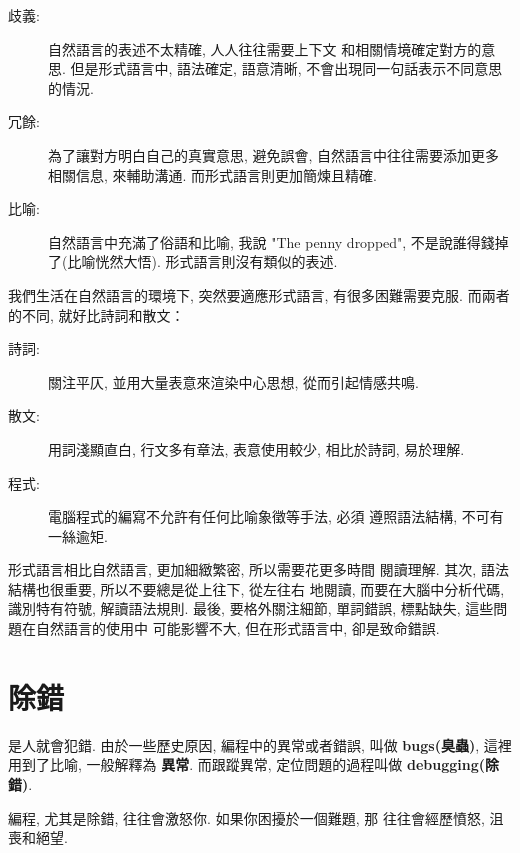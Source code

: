 \documentclass[10pt]{book}
\begin{document}
\begin{description}

\item[歧義:] 自然語言的表述不太精確, 人人往往需要上下文
和相關情境確定對方的意思. 但是形式語言中, 語法確定, 語意清晰, 
不會出現同一句話表示不同意思的情況. 

\item[冗餘:] 為了讓對方明白自己的真實意思, 避免誤會, 
自然語言中往往需要添加更多相關信息, 來輔助溝通. 
而形式語言則更加簡煉且精確. 

\item[比喻:] 自然語言中充滿了俗語和比喻, 我說 "The penny dropped", 
不是說誰得錢掉了(比喻恍然大悟). 形式語言則沒有類似的表述. 

\end{description}

我們生活在自然語言的環境下, 突然要適應形式語言, 有很多困難需要克服. 
而兩者的不同, 就好比詩詞和散文：  

\begin{description}

\item[詩詞:] 關注平仄, 並用大量表意來渲染中心思想, 從而引起情感共鳴. 

\item[散文:] 用詞淺顯直白, 行文多有章法, 表意使用較少, 相比於詩詞, 易於理解. 

\item[程式:] 電腦程式的編寫不允許有任何比喻象徵等手法, 必須
遵照語法結構, 不可有一絲逾矩. 


\end{description}

形式語言相比自然語言, 更加細緻繁密, 所以需要花更多時間
閱讀理解. 其次, 語法結構也很重要, 所以不要總是從上往下, 從左往右
地閱讀, 而要在大腦中分析代碼, 識別特有符號, 解讀語法規則. 
最後, 要格外關注細節, 單詞錯誤, 標點缺失, 這些問題在自然語言的使用中
可能影響不大, 但在形式語言中, 卻是致命錯誤. 

\section{除錯}

是人就會犯錯. 由於一些歷史原因, 編程中的異常或者錯誤, 叫做 {\bf bugs(臭蟲)}, 
這裡用到了比喻, 一般解釋為 {\bf 異常}. 
而跟蹤異常, 定位問題的過程叫做 {\bf debugging(除錯)}. 

編程, 尤其是除錯, 往往會激怒你. 如果你困擾於一個難題, 那
往往會經歷憤怒, 沮喪和絕望. 
\end{document}
